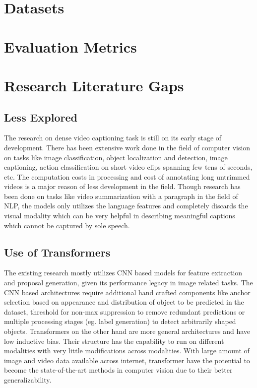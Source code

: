 \section{Datasets}

\section{Evaluation Metrics}




\section{Research Literature Gaps}
\subsection{Less Explored}
\par The research on dense video captioning task is still on its early stage of development. There has been extensive work done in the field of computer vision on tasks like image classification, object localization and detection, image captioning, action classification on short video clips spanning few tens of seconds, etc. The computation costs in processing and cost of annotating long untrimmed videos is a major reason of less development in the field. Though research has been done on tasks like video summarization with a paragraph in the field of NLP, the models only utilizes the language features and completely discards the visual modality which can be very helpful in describing meaningful captions which cannot be captured by sole speech. 

\subsection{Use of Transformers}
\par The existing research mostly utilizes CNN based models for feature extraction and proposal generation, given its performance legacy in image related tasks. The CNN based architectures require additional hand crafted components like anchor selection based on appearance and distribution of object to be predicted in the dataset, threshold for non-max suppression to remove redundant predictions or multiple processing stages (eg. label generation) to detect arbitrarily shaped objects. Transformers on the other hand are more general architectures and have low inductive bias. Their structure has the capability to run on different modalities with very little modifications across modalities. With large amount of image and video data available across internet, transformer have the potential to become the state-of-the-art methods in computer vision due to their better generalizability.


